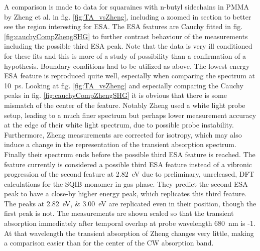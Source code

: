 \documentclass[twoside,openright,listof=numbered]{scrreprt}
\begin{document}
A comparison is made to data for squaraines with n-butyl sidechains in PMMA by Zheng et al.\cite{Zheng2020} in fig. \ref{fig:TA_vsZheng}, including a zoomed in section to better see the region interesting for ESA.  The ESA features are Cauchy fitted in fig. \ref{fig:cauchyCompZhengSHG} to further contrast behaviour of the measurements including the possible third ESA peak. Note that the data is very ill conditioned for these fits and this is more of a study of possibility than a confirmation of a hypothesis. Boundary conditions had to be utilized as above. The lowest energy ESA feature is reproduced quite well, especially when comparing the spectrum at \qty{10}{\pico\second}. Looking at fig. \ref{fig:TA_vsZheng} and especially comparing the Cauchy peaks in fig. \ref{fig:cauchyCompZhengSHG} it is obvious that there is some mismatch of the center of the feature. Notably Zheng\cite{Zheng2020} used a white light probe setup, leading to a much finer spectrum but perhaps lower measurement accuracy at the edge of their white light spectrum, due to possible probe instability. Furthermore, Zheng measurements are corrected for isotropy, which may also induce a change in the representation of the transient absorption spectrum. Finally their spectrum ends before the possible third ESA feature is reached. The feature currently is considered a possible third ESA feature instead of a vibronic progression of the second feature at \qty{2.82}{\electronvolt} due to preliminary, unreleased, DFT calculations for the SQIB monomer in gas phase. They predict the second ESA peak to have a close-by higher energy peak, which replicates this third feature. The peaks at \qtylist{2.82;3.00}{\electronvolt} are replicated even in their position, though the first peak is not.
The measurements are shown scaled so that the transient absorption immediately after temporal overlap at probe wavelength \SI{680}{\nano\meter} is -1. At that wavelength the transient absorption of Zheng changes very little, making a comparison easier than for the center of the CW absorption band.

\end{document}
